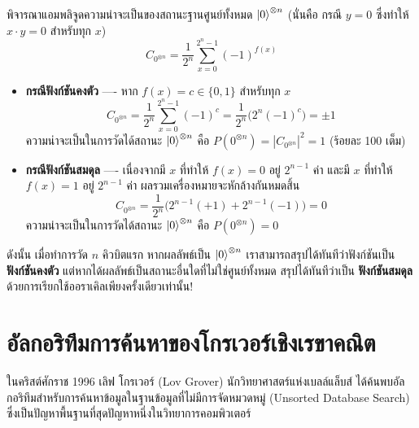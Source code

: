 พิจารณาแอมพลิจูดความน่าจะเป็นของสถานะฐานศูนย์ทั้งหมด $\ket{0}^{\otimes n}$ (นั่นคือ กรณี $y = 0$ ซึ่งทำให้ $x \cdot y = 0$ สำหรับทุก $x$)
\begin{equation}
C_{0^{\otimes n}} = \frac{1}{2^n} \sum_{x=0}^{2^n-1} (-1)^{f(x)}
\end{equation}
\begin{itemize}
    \item \textbf{กรณีฟังก์ชันคงตัว} ---- หาก $f(x) = c \in \{0, 1\}$ สำหรับทุก $x$
    \begin{equation}
    C_{0^{\otimes n}} = \frac{1}{2^n} \sum_{x=0}^{2^n-1} (-1)^c = \frac{1}{2^n} \big( 2^n (-1)^c \big) = \pm 1
    \end{equation}
    ความน่าจะเป็นในการวัดได้สถานะ $\ket{0}^{\otimes n}$ คือ $P(0^{\otimes n}) = |C_{0^{\otimes n}}|^2 = 1$ (ร้อยละ 100 เต็ม)
    \item \textbf{กรณีฟังก์ชันสมดุล} ---- เนื่องจากมี $x$ ที่ทำให้ $f(x)=0$ อยู่ $2^{n-1}$ ค่า และมี $x$ ที่ทำให้ $f(x)=1$ อยู่ $2^{n-1}$ ค่า ผลรวมเครื่องหมายจะหักล้างกันหมดสิ้น
    \begin{equation}
    C_{0^{\otimes n}} = \frac{1}{2^n} \Big( 2^{n-1}(+1) + 2^{n-1}(-1) \Big) = 0
    \end{equation}
    ความน่าจะเป็นในการวัดได้สถานะ $\ket{0}^{\otimes n}$ คือ $P(0^{\otimes n}) = 0$
\end{itemize}

ดังนั้น เมื่อทำการวัด $n$ คิวบิตแรก หากผลลัพธ์เป็น $\ket{0}^{\otimes n}$ เราสามารถสรุปได้ทันทีว่าฟังก์ชันเป็น \textbf{ฟังก์ชันคงตัว} แต่หากได้ผลลัพธ์เป็นสถานะอื่นใดที่ไม่ใช่ศูนย์ทั้งหมด สรุปได้ทันทีว่าเป็น \textbf{ฟังก์ชันสมดุล} ด้วยการเรียกใช้ออราเคิลเพียงครั้งเดียวเท่านั้น!

\section{อัลกอริทึมการค้นหาของโกรเวอร์เชิงเรขาคณิต}

ในคริสต์ศักราช 1996 เลิฟ โกรเวอร์ (Lov Grover) นักวิทยาศาสตร์แห่งเบลล์แล็บส์ ได้ค้นพบอัลกอริทึมสำหรับการค้นหาข้อมูลในฐานข้อมูลที่ไม่มีการจัดหมวดหมู่ (Unsorted Database Search) ซึ่งเป็นปัญหาพื้นฐานที่สุดปัญหาหนึ่งในวิทยาการคอมพิวเตอร์

